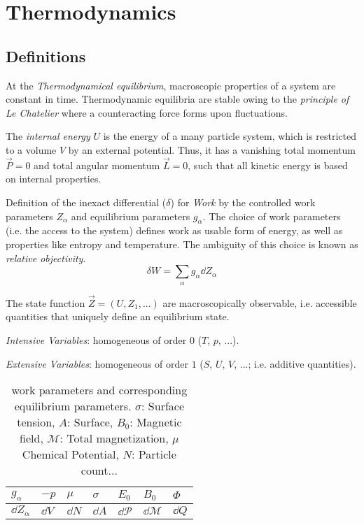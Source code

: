 \section{Thermodynamics}
	\subsection{Definitions}
		At the \emph{Thermodynamical equilibrium}, macroscopic properties of a system are constant in time.
		Thermodynamic equilibria are stable owing to the \emph{principle of Le Chatelier} where a counteracting force forms upon fluctuations.\vsp

		The \emph{internal energy} $U$ is the energy of a many particle system, which is restricted to a volume $V$ by an external potential. Thus, it has a vanishing total momentum $\vec{P}=0$ and total angular momentum $\vec{L} = 0$, such that all kinetic energy is based on internal properties. \vsp

		Definition of the inexact differential ($\delta$) for \emph{Work} by the controlled work parameters $Z_\alpha$ and equilibrium parameters $g_\alpha$.
		The choice of work parameters (i.e. the access to the system) defines work as usable form of energy, as well as properties like entropy and temperature. The ambiguity of this choice is known as \emph{relative objectivity}.
		\begin{equation}
			\delta W = \sum_\alpha g_\alpha \dd Z_\alpha
		\end{equation} \vsp

		The state function $\vec{Z}=\left(U, Z_1,... \right)$ are macroscopically observable, i.e. accessible quantities that uniquely define an equilibrium state. \vsp

		\emph{Intensive Variables}: homogeneous of order $0$ ($T$, $p$, ...). \vsp

		\emph{Extensive Variables}: homogeneous of order $1$ ($S$, $U$, $V$, ...; i.e. additive quantities). \vsp

		\begin{table}[ht]
			\begin{center}
				\begin{tabular}{ l | l l l l l l }
					$g_\alpha$ & $-p$ & $\mu$ & $\sigma$ & $E_0$ & $B_0$ & $\Phi$ \\ \hline
					$\dd Z_\alpha$ & $\dd V$ & $\dd N$ & $\dd A$ & $\dd \mathcal{P}$ & $\dd \mathcal{M}$ & $\dd Q$ \\
				\end{tabular}
				\caption{work parameters and corresponding equilibrium parameters. $\sigma$: Surface tension, $A$: Surface, $B_0$: Magnetic field, $\mathcal{M}$: Total magnetization, $\mu$ Chemical Potential, $N$: Particle count...}
				\label{tab:WorkParametersAndEquilibriumParameters}
			\end{center}
		\end{table} \vsp

